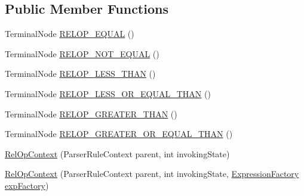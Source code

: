 \subsection*{Public Member Functions}
\begin{DoxyCompactItemize}
\item 
Terminal\+Node \hyperlink{classgov_1_1nasa_1_1jpf_1_1inspector_1_1server_1_1expression_1_1parser_1_1_expression_grammar_parser_1_1_rel_op_context_a6eb4a1528592e8963a8b67c3cc89c401}{R\+E\+L\+O\+P\+\_\+\+E\+Q\+U\+AL} ()
\item 
Terminal\+Node \hyperlink{classgov_1_1nasa_1_1jpf_1_1inspector_1_1server_1_1expression_1_1parser_1_1_expression_grammar_parser_1_1_rel_op_context_a8f6aba9ff1d16d0805da9418d5fe9aae}{R\+E\+L\+O\+P\+\_\+\+N\+O\+T\+\_\+\+E\+Q\+U\+AL} ()
\item 
Terminal\+Node \hyperlink{classgov_1_1nasa_1_1jpf_1_1inspector_1_1server_1_1expression_1_1parser_1_1_expression_grammar_parser_1_1_rel_op_context_a10706379abc1af644c63c9754d837d92}{R\+E\+L\+O\+P\+\_\+\+L\+E\+S\+S\+\_\+\+T\+H\+AN} ()
\item 
Terminal\+Node \hyperlink{classgov_1_1nasa_1_1jpf_1_1inspector_1_1server_1_1expression_1_1parser_1_1_expression_grammar_parser_1_1_rel_op_context_a5cc4dbdad2940f23dba0f91bd1de1695}{R\+E\+L\+O\+P\+\_\+\+L\+E\+S\+S\+\_\+\+O\+R\+\_\+\+E\+Q\+U\+A\+L\+\_\+\+T\+H\+AN} ()
\item 
Terminal\+Node \hyperlink{classgov_1_1nasa_1_1jpf_1_1inspector_1_1server_1_1expression_1_1parser_1_1_expression_grammar_parser_1_1_rel_op_context_a0468705bffaf4e8498ba71e35ab3c982}{R\+E\+L\+O\+P\+\_\+\+G\+R\+E\+A\+T\+E\+R\+\_\+\+T\+H\+AN} ()
\item 
Terminal\+Node \hyperlink{classgov_1_1nasa_1_1jpf_1_1inspector_1_1server_1_1expression_1_1parser_1_1_expression_grammar_parser_1_1_rel_op_context_a27dd3091c170632827ae3e9815189e68}{R\+E\+L\+O\+P\+\_\+\+G\+R\+E\+A\+T\+E\+R\+\_\+\+O\+R\+\_\+\+E\+Q\+U\+A\+L\+\_\+\+T\+H\+AN} ()
\item 
\hyperlink{classgov_1_1nasa_1_1jpf_1_1inspector_1_1server_1_1expression_1_1parser_1_1_expression_grammar_parser_1_1_rel_op_context_af20ba005d1800c7fb99bed38929e5d26}{Rel\+Op\+Context} (Parser\+Rule\+Context parent, int invoking\+State)
\item 
\hyperlink{classgov_1_1nasa_1_1jpf_1_1inspector_1_1server_1_1expression_1_1parser_1_1_expression_grammar_parser_1_1_rel_op_context_a6e14a5be57f212d0a619421f737731c6}{Rel\+Op\+Context} (Parser\+Rule\+Context parent, int invoking\+State, \hyperlink{classgov_1_1nasa_1_1jpf_1_1inspector_1_1server_1_1expression_1_1_expression_factory}{Expression\+Factory} \hyperlink{classgov_1_1nasa_1_1jpf_1_1inspector_1_1server_1_1expression_1_1parser_1_1_expression_grammar_parser_1_1_rel_op_context_a1979e878466cd0a896c66876b5138a10}{exp\+Factory})

\end{DoxyCompactItemize}
